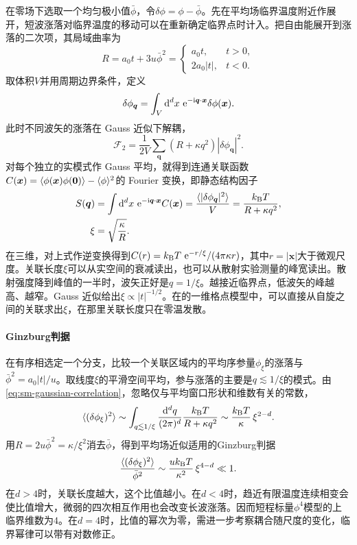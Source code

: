 在零场下选取一个均匀极小值$\bar\phi$，令$\delta\phi = \phi - \bar\phi$。先在平均场临界温度附近作展开，短波涨落对临界温度的移动可以在重新确定临界点时计入。把自由能展开到涨落的二次项，其局域曲率为
\[
    R = a_0t + 3u\bar\phi^2 =
    \begin{cases}a_0t,& t > 0,\\ 2a_0|t|,& t < 0.\end{cases}
\]
取体积$V$并用周期边界条件，定义
\[
	\delta\phi_{\bm q} = \int_V \mathop{}\!\mathrm{d}^d x\,\mathop{}\!\mathrm{e}^{-\mathrm{i}\bm q\cdot\bm x}\delta\phi(\bm x).
\]
此时不同波矢的涨落在 Gauss 近似下解耦，
\begin{equation}
    \label{eq:sm-gaussian-fluctuation-functional}
    \mathcal F_2 = \frac1{2V}\sum_{\bm q}(R + \kappa q^2)|\delta\phi_{\bm q}|^2 .
\end{equation}
对每个独立的实模式作 Gauss 平均，就得到连通关联函数$C(\bm x) = \langle\phi(\bm x)\phi(\bm0)\rangle - \langle\phi\rangle^2$的 Fourier 变换，即静态结构因子
\begin{subequations}
	\begin{align}
		S(\bm q) &= \int \mathop{}\!\mathrm{d}^d x\,\mathop{}\!\mathrm{e}^{-\mathrm{i}\bm q\cdot\bm x}C(\bm x)
		= \frac{\langle|\delta\phi_{\bm q}|^2\rangle}{V}
		= \frac{k_{\mathrm{B}} T}{R + \kappa q^2}, \label{eq:sm-gaussian-correlation}\\
		\xi &= \sqrt{\frac{\kappa}{R}} .
	\end{align}
\end{subequations}
在三维，对上式作逆变换得到$C(r) = k_{\mathrm{B}} T\,\mathop{}\!\mathrm{e}^{-r/\xi}/(4\pi\kappa r)$，其中$r = |\bm x|$大于微观尺度。关联长度$\xi$可以从实空间的衰减读出，也可以从散射实验测量的峰宽读出。散射强度降到峰值的一半时，波矢正好是$q = 1/\xi$。越接近临界点，低波矢的峰越高、越窄。Gauss 近似给出$\xi \propto |t|^{-1/2}$。在的一维格点模型中，可以直接从自旋之间的关联求出$\xi$，在那里关联长度只在零温发散。

\paragraph{Ginzburg判据}
在有序相选定一个分支，比较一个关联区域内的平均序参量$\phi_\xi$的涨落与$\bar\phi^2 = a_0|t|/u$。取线度$\xi$的平滑空间平均，参与涨落的主要是$q \lesssim 1/\xi$的模式。由\eqref{eq:sm-gaussian-correlation}，忽略仅与平均窗口形状和维数有关的常数，
\[
    \langle(\delta\phi_\xi)^2\rangle \sim
    \int_{q\lesssim1/\xi}\frac{\mathop{}\!\mathrm{d}^d q}{(2\pi)^d}
         \frac{k_{\mathrm{B}} T}{R + \kappa q^2}
    \sim \frac{k_{\mathrm{B}} T}{\kappa}\,\xi^{2-d}.
\]
用$R = 2u\bar\phi^2 = \kappa/\xi^2$消去$\bar\phi$，得到平均场近似适用的Ginzburg判据
\begin{equation}
    \frac{\langle(\delta\phi_\xi)^2\rangle}{\bar\phi^2}
    \sim \frac{uk_{\mathrm{B}} T}{\kappa^2}\,\xi^{4-d} \ll 1 .
\end{equation}
在$d > 4$时，关联长度越大，这个比值越小。在$d < 4$时，趋近有限温度连续相变会使比值增大，微弱的四次相互作用也会改变长波涨落。因而短程标量$\phi^4$模型的上临界维数为$4$。在$d = 4$时，比值的幂次为零，需进一步考察耦合随尺度的变化，临界幂律可以带有对数修正。

